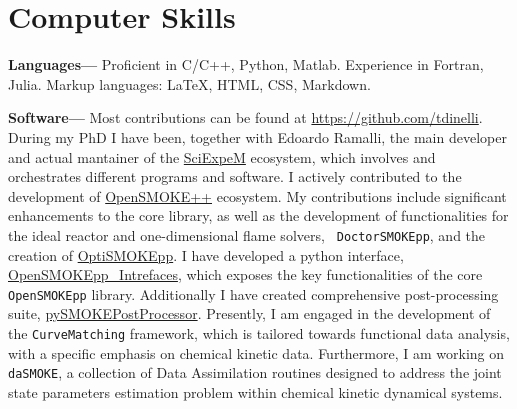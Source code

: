 \section{\sc Computer Skills}
{\bf Languages---}
Proficient in C/C++, Python, Matlab. Experience in Fortran, Julia. Markup languages:
\LaTeX, HTML, CSS, Markdown.


{\bf Software---}%
Most contributions can be found at \url{https://github.com/tdinelli}. During my PhD I have
been, together with Edoardo Ramalli, the main developer and actual mantainer of the
\href{https://sciexpem.polimi.it/}{SciExpeM} ecosystem, which involves and orchestrates
different programs and software. I actively contributed to the development of
\href{https://www.opensmokepp.polimi.it/}{OpenSMOKE++} ecosystem. My contributions include
significant enhancements to the core library, as well as the development of
functionalities for the ideal reactor and one-dimensional flame solvers, {\tt
DoctorSMOKEpp}, and the creation of
\href{https://github.com/burn-research/OptiSMOKE_toolbox}{OptiSMOKEpp}. I have developed a
python interface,
\href{https://github.com/tdinelli/OpenSMOKEpp_Interfaces}{OpenSMOKEpp\_Intrefaces}, which
exposes the key functionalities of the core {\tt OpenSMOKEpp} library. Additionally I have
created comprehensive post-processing suite,
\href{https://github.com/tdinelli/pySMOKEPostProcessor}{pySMOKEPostProcessor}. Presently,
I am engaged in the development of the \texttt{CurveMatching} framework, which is tailored
towards functional data analysis, with a specific emphasis on chemical kinetic data.
Furthermore, I am working on \texttt{daSMOKE}, a collection of Data Assimilation routines
designed to address the joint state parameters estimation problem within chemical kinetic
dynamical systems.
